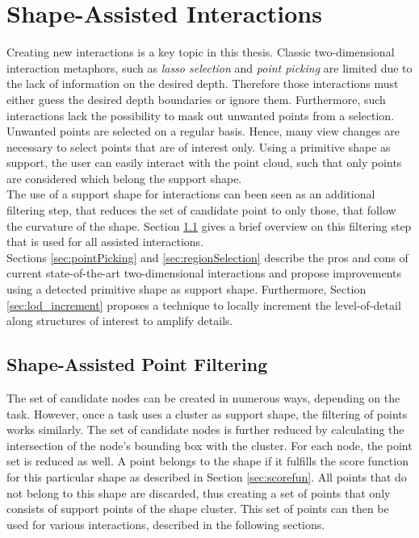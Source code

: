 \section{Shape-Assisted Interactions}
\label{sec:interactions}

Creating new interactions is a key topic in this thesis. Classic two-dimensional interaction metaphors, such as \textit{lasso selection} and \textit{point picking} are limited due to the lack of information on the desired depth. Therefore those interactions must either guess the desired depth boundaries or ignore them. Furthermore, such interactions lack the possibility to mask out unwanted points from a selection. Unwanted points are selected on a regular basis. Hence, many view changes are necessary to select points that are of interest only. Using a primitive shape as support, the user can easily interact with the point cloud, such that only points are considered which belong the support shape. 
\\
The use of a support shape for interactions can been seen as an additional filtering step, that reduces the set of candidate point to only those, that follow the curvature of the shape. Section \ref{sec:pointFiltering} gives a brief overview on this filtering step that is used for all assisted interactions. 
\\
Sections \ref{sec:pointPicking} and \ref{sec:regionSelection} describe the pros and cons of current state-of-the-art two-dimensional interactions and propose improvements using a detected primitive shape as support shape. Furthermore, Section \ref{sec:lod_increment} proposes a technique to locally increment the level-of-detail along structures of interest to amplify details. 


\subsection{Shape-Assisted Point Filtering}
\label{sec:pointFiltering}

The set of candidate nodes can be created in numerous ways, depending on the task. However, once a task uses a cluster as support shape, the filtering of points works similarly. The set of candidate nodes is further reduced by calculating the intersection of the node's bounding box with the cluster. For each node, the point set is reduced as well. A point belongs to the shape if it fulfills the score function for this particular shape as described in Section \ref{sec:scorefun}. All points that do not belong to this shape are discarded, thus creating a set of points that only consists of support points of the shape cluster. This set of points can then be used for various interactions, described in the following sections. 



